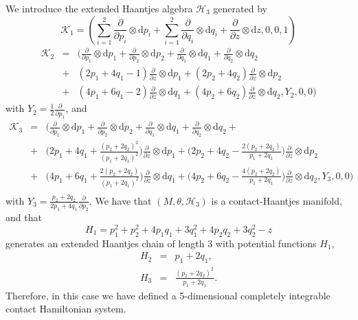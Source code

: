 \documentclass[10pt]{amsart}
\numberwithin{equation}{section}
\newcommand{\beq}{\begin{equation}}
\newcommand{\eeq}{\end{equation}}
\newcommand{\bea}{\begin{eqnarray}}
\newcommand{\eea}{\end{eqnarray}}
\newcommand{\nn}{\nonumber}
\newcommand{\rd}{\mathrm{d}}
\theoremstyle{definition}
\begin{document}
We introduce the extended Haantjes algebra $\mathscr{H}_3$ generated by
\beq \label{eq:iden}
\mathcal{K}_1= \left(\sum_{i=1}^{2}\frac{\partial}{\partial p_i}\otimes \rd p_i+\sum_{i=1}^{2}\frac{\partial}{\partial q_i}\otimes \rd q_i+\frac{\partial}{\partial z}\otimes \rd z,0,0,1\right)
\eeq
\bea
\mathcal{K}_2&=&  \Bigg(\frac{\partial}{\partial p_1}\otimes \rd p_1+ \frac{\partial}{\partial p_2}\otimes \rd p_2+\frac{\partial}{\partial q_1}\otimes \rd q_1+\frac{\partial}{\partial q_2}\otimes \rd q_2 \\ \nn 
&+&   (2 p_1+4 q_1-1)  \frac{\partial}{\partial z}\otimes \rd p_1+ (2 p_2+ 4 q_2) \frac{\partial}{\partial z}\otimes \rd p_2 \\ \nn
&+& (4 p_1+ 6 q_1 -2) \frac{\partial}{\partial z}\otimes \rd q_1 +  (4 p_2+ 6 q_2) \frac{\partial}{\partial z} \otimes \rd q_2, Y_{2},0,0 \Bigg)
\eea
with $Y_{2}=\frac{1}{2}\frac{\partial}{\partial p_{1}}$,
and
\bea
\nn \mathcal{K}_3&=&  \Bigg(\frac{\partial}{\partial p_1}\otimes \rd p_1 +  \frac{\partial}{\partial p_2}\otimes \rd p_2 + \frac{\partial}{\partial q_1}\otimes \rd q_1 + \frac{\partial}{\partial q_2}\otimes \rd q_2 + \\ \nn  &+& \Big(2 p_1+4 q_1+\frac{(p_2+2 q_2)^2}{(p_1+2 q_1)^2}\Big) \frac{\partial}{\partial z}\otimes \rd p_1 +\Big(2 p_2+ 4 q_2 -\frac{2(p_2+2 q_2)}{p_1+2 q_1}\Big) \frac{\partial}{\partial z}\otimes \rd p_2 \\ \nn &+&  \Big(4 p_1+ 6 q_1 +\frac{2(p_2+2 q_2)}{(p_1+2 q_1)^2}\Big) \frac{\partial}{\partial z }\otimes \rd q_1 +\Big(4 p_2+ 6 q_2-\frac{4(p_2+2 q_2)}{p_1+2 q_1}\Big) \frac{\partial}{\partial z} \otimes \rd q_2,Y_{3},0,0 \Bigg) \\
\eea
with $Y_{3}=\frac{p_{2}+2q_{2}}{2p_{1}+4q_{1}}\frac{\partial}{\partial p_{2}}$. We have that $(M,\theta,\mathscr{H}_{3})$ is a contact-Haantjes manifold, and that
\beq
H_1=p_1^2 +p_2^2+ 4 p_1 q_1 +3 q_1^2 + 4 p_2 q_2 +3 q_2^2 -z
\eeq
generates an extended Haantjes chain of length $3$ with potential functions $H_{1}$,
\bea
H_2 &=& p_1+2 q_1,  \\
H_3 &=& \frac{(p_2+2 q_2)^2}{p_1+ 2 q_1}.
\eea
Therefore, in this case we have defined a 5-dimensional completely integrable contact Hamiltonian system.
\end{document}
